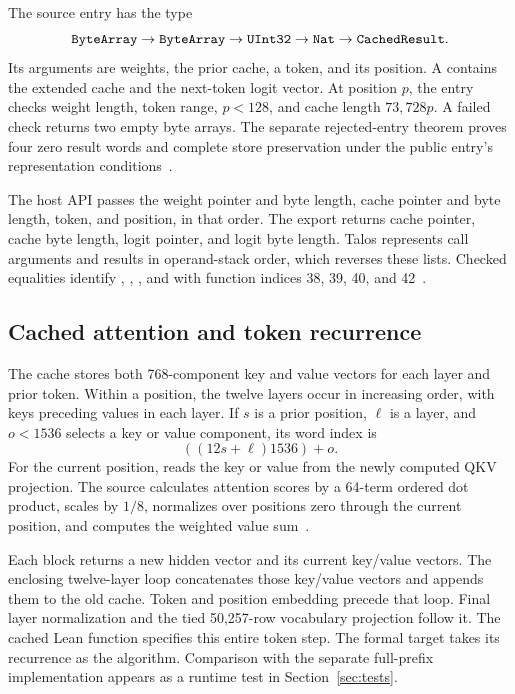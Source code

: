 The source entry has the type
\[
\texttt{ByteArray}\to\texttt{ByteArray}\to\texttt{UInt32}\to\texttt{Nat}\to\texttt{CachedResult}.
\]
Its arguments are weights, the prior cache, a token, and its position.  A  contains the extended cache and the next-token logit vector.  At position $p$, the entry checks weight length, token range, $p<128$, and cache length $73{,}728p$.  A failed check returns two empty byte arrays.  The separate rejected-entry theorem proves four zero result words and complete store preservation under the public entry's representation conditions~\cite{entry}.

The host API passes the weight pointer and byte length, cache pointer and byte length, token, and position, in that order.  The export returns cache pointer, cache byte length, logit pointer, and logit byte length.  Talos represents call arguments and results in operand-stack order, which reverses these lists.  Checked equalities identify , , , and  with function indices 38, 39, 40, and 42~\cite{initialize}.

\subsection{Cached attention and token recurrence}

The cache stores both 768-component key and value vectors for each layer and prior token.  Within a position, the twelve layers occur in increasing order, with keys preceding values in each layer.  If $s$ is a prior position, $\ell$ is a layer, and $o<1536$ selects a key or value component, its word index is
\[
((12s+\ell)1536)+o.
\]
For the current position,  reads the key or value from the newly computed QKV projection.  The source calculates attention scores by a 64-term ordered dot product, scales by $1/8$, normalizes over positions zero through the current position, and computes the weighted value sum~\cite{cached}.

Each block returns a new hidden vector and its current key/value vectors.  The enclosing twelve-layer loop concatenates those key/value vectors and appends them to the old cache.  Token and position embedding precede that loop.  Final layer normalization and the tied 50,257-row vocabulary projection follow it.  The cached Lean function specifies this entire token step.  The formal target takes its recurrence as the algorithm.  Comparison with the separate full-prefix implementation appears as a runtime test in Section~\ref{sec:tests}.

